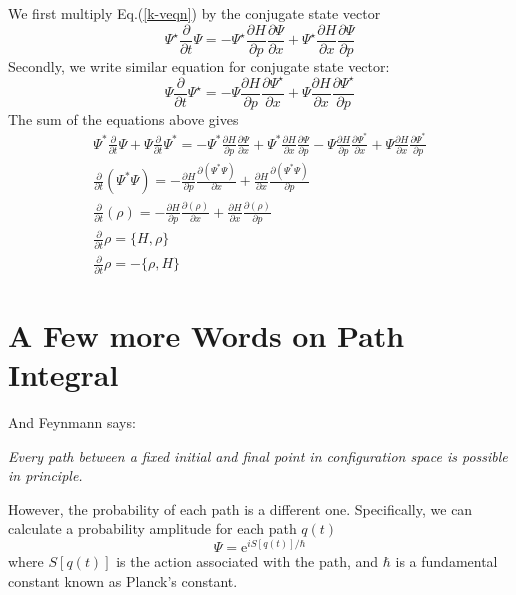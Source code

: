 We first multiply Eq.(\ref{k-veqn}) by the conjugate state vector
\begin{equation}
\Psi^{\star} \frac{\partial}{\partial t} \Psi=-\Psi^{\star} \frac{\partial H}{\partial p} \frac{\partial \Psi}{\partial x}+\Psi^{\star} \frac{\partial H}{\partial x} \frac{\partial \Psi}{\partial p}
\end{equation}
Secondly, we write similar equation for conjugate state vector:
\begin{equation}
\Psi \frac{\partial}{\partial t} \Psi^{\star}=-\Psi \frac{\partial H}{\partial p} \frac{\partial \Psi^{\star}}{\partial x}+\Psi \frac{\partial H}{\partial x} \frac{\partial \Psi^{\star}}{\partial p}
\end{equation}
The sum of the equations above gives
$$
\begin{array}{l}
{\Psi^{*} \frac{\partial}{\partial t} \Psi+\Psi \frac{\partial}{\partial t} \Psi^{*}=-\Psi^{*} \frac{\partial H}{\partial p} \frac{\partial \Psi}{\partial x}+\Psi^{*} \frac{\partial H}{\partial x} \frac{\partial \Psi}{\partial p}-\Psi \frac{\partial H}{\partial p} \frac{\partial \Psi^{*}}{\partial x}+\Psi \frac{\partial H}{\partial x} \frac{\partial \Psi^{*}}{\partial p}} \\
{\frac{\partial}{\partial t}\left(\Psi^{*} \Psi\right)=-\frac{\partial H}{\partial p} \frac{\partial\left(\Psi^{*} \Psi\right)}{\partial x}+\frac{\partial H}{\partial x} \frac{\partial\left(\Psi^{*} \Psi\right)}{\partial p}} \\
{\frac{\partial}{\partial t}(\rho)=-\frac{\partial H}{\partial p} \frac{\partial(\rho)}{\partial x}+\frac{\partial H}{\partial x} \frac{\partial(\rho)}{\partial p}} \\
{\frac{\partial}{\partial t} \rho=\{H, \rho\}} \\
{\frac{\partial}{\partial t} \rho=-\{\rho, H\}}
\end{array}
$$

\section{A Few more Words on Path Integral}
And Feynmann says:
\begin{qt}
\begin{center}
    \textit{Every path between a fixed initial and final point in configuration space is possible in principle.}
\end{center}
\end{qt}
However, the probability of each path is a different one. Specifically, we can calculate a probability amplitude for each path $q(t)$
\begin{equation}
\Psi=\mathrm{e}^{i S[q(t)] / \hbar}
\end{equation}
where $S[q(t)]$ is the action associated with the path, and $\hbar$ is a fundamental constant known as Planck's constant.

